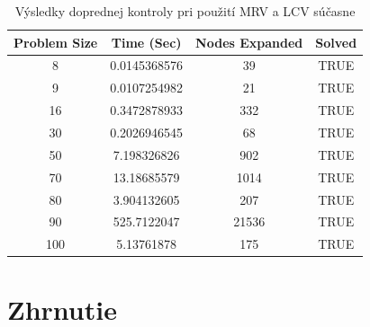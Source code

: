 \begin{table}[h!]
  \centering
  \begin{tabular}{|c|c|c|c|}
    \hline
    \textbf{Problem Size} & \textbf{Time (Sec)} & \textbf{Nodes Expanded} & \textbf{Solved} \\
    \hline
    8   & 0.0145368576 & 39    & TRUE \\
    9   & 0.0107254982 & 21    & TRUE \\
    16  & 0.3472878933 & 332   & TRUE \\
    30  & 0.2026946545 & 68    & TRUE \\
    50  & 7.198326826  & 902   & TRUE \\
    70  & 13.18685579  & 1014  & TRUE \\
    80  & 3.904132605  & 207   & TRUE \\
    90  & 525.7122047  & 21536 & TRUE \\
    100 & 5.13761878   & 175   & TRUE \\
    \hline
  \end{tabular}
  \caption{Výsledky doprednej kontroly pri použití MRV a LCV súčasne}
  \label{tab:forward_checking_extended_results}
\end{table}

\section{Zhrnutie}

